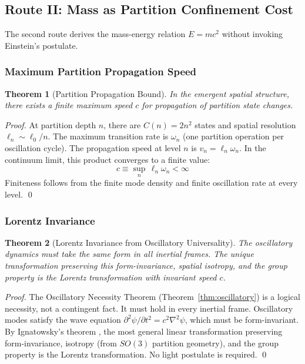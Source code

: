 \documentclass[twocolumn,10pt,a4paper]{article}
\newtheorem{theorem}{Theorem}[section]
\theoremstyle{definition}
\theoremstyle{remark}
\begin{document}
\subsection{Route II: Mass as Partition Confinement Cost}

The second route derives the mass-energy relation $E = mc^2$ without invoking Einstein's postulate.

\subsubsection{Maximum Partition Propagation Speed}

\begin{theorem}[Partition Propagation Bound]
\label{thm:propagation}
In the emergent spatial structure, there exists a finite maximum speed $c$ for propagation of partition state changes.
\end{theorem}

\begin{proof}
At partition depth $n$, there are $C(n) = 2n^2$ states and spatial resolution $\ell_n \sim \ell_0/n$. The maximum transition rate is $\omega_n$ (one partition operation per oscillation cycle). The propagation speed at level $n$ is $v_n = \ell_n \omega_n$. In the continuum limit, this product converges to a finite value:
\begin{equation}
    c \equiv \sup_n \, \ell_n \omega_n < \infty
\end{equation}
Finiteness follows from the finite mode density and finite oscillation rate at every level. \qed
\end{proof}

\subsubsection{Lorentz Invariance}

\begin{theorem}[Lorentz Invariance from Oscillatory Universality]
\label{thm:lorentz}
The oscillatory dynamics must take the same form in all inertial frames. The unique transformation preserving this form-invariance, spatial isotropy, and the group property is the Lorentz transformation with invariant speed $c$.
\end{theorem}

\begin{proof}
The Oscillatory Necessity Theorem (Theorem~\ref{thm:oscillatory}) is a logical necessity, not a contingent fact. It must hold in every inertial frame. Oscillatory modes satisfy the wave equation $\partial^2\psi/\partial t^2 = c^2\nabla^2\psi$, which must be form-invariant. By Ignatowsky's theorem \citep{ignatowsky1910,frank1911}, the most general linear transformation preserving form-invariance, isotropy (from $SO(3)$ partition geometry), and the group property is the Lorentz transformation. No light postulate is required. \qed
\end{proof}
\end{document}
